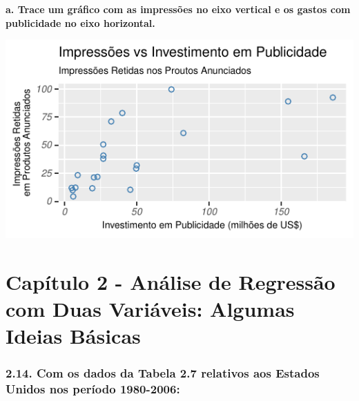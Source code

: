 \documentclass[
  11pt,
  a4paper,
]{article}
\begin{document}
\textbf{a. Trace um gráfico com as impressões no eixo vertical e os gastos com publicidade no eixo horizontal.}

\begin{center}\includegraphics{article_files/figure-latex/unnamed-chunk-10-1} \end{center}

\newpage

\hypertarget{capuxedtulo-2---anuxe1lise-de-regressuxe3o-com-duas-variuxe1veis-algumas-ideias-buxe1sicas}{%
\section{Capítulo 2 - Análise de Regressão com Duas Variáveis: Algumas Ideias Básicas}\label{capuxedtulo-2---anuxe1lise-de-regressuxe3o-com-duas-variuxe1veis-algumas-ideias-buxe1sicas}}

\hypertarget{com-os-dados-da-tabela-2.7-relativos-aos-estados-unidos-nos-peruxedodo-1980-2006}{%
\subsubsection{2.14. Com os dados da Tabela 2.7 relativos aos Estados Unidos nos período 1980-2006:}\label{com-os-dados-da-tabela-2.7-relativos-aos-estados-unidos-nos-peruxedodo-1980-2006}}
\end{document}
